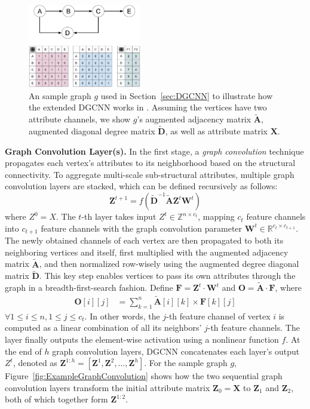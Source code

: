 \begin{figure}[htbp]
\centerline{\includegraphics[width=0.44\textwidth]{Magic/figures/ExampleGraph.eps}}
\caption{An sample graph $g$ used in Section~\ref{sec:DGCNN} to illustrate how the extended DGCNN works in \sysname.
Assuming the vertices have two attribute channels, we show
$g$'s augmented adjacency matrix $\tilde{\mathbf{A}}$, augmented diagonal degree matrix $\tilde{\mathbf{D}}$,
as well as attribute matrix $\mathbf{X}$.}
\label{fig:ExampleGraph}
\end{figure}

\textbf{Graph Convolution Layer(s).} In the first stage, a \textit{graph convolution} technique propagates each vertex's attributes to its neighborhood based on the structural connectivity.
To aggregate multi-scale sub-structural attributes, multiple graph
convolution layers are stacked, which can be defined recursively as follows:
\begin{equation}
    \mathbf{Z}^{t + 1} = f(\tilde{\mathbf{D}}^{-1} \tilde{\mathbf{A}} \mathbf{Z}^t \mathbf{W}^t)
\end{equation}
where $Z^0 = X$. The $t$-th layer takes input $Z^t \in \mathbb{Z}^{n \times c_t}$,
mapping $c_t$ feature channels into $c_{t+1}$ feature channels with the graph convolution parameter $\mathbf{W}^t \in \mathbb{R}^{c_t \times c_{t+1}}$.
The newly obtained channels of each vertex are then propagated to both its neighboring vertices and itself,
 first multiplied with the augmented adjacency matrix $\tilde{\mathbf{A}}$,
and then normalized row-wisely using the augmented degree diagonal matrix $\tilde{\mathbf{D}}$.
This key step enables vertices to pass its own attributes through the graph in a breadth-first-search fashion. %
Define $\mathbf{F} = \mathbf{Z}^t \cdot \mathbf{W}^t$ and $\mathbf{O} = \tilde{\mathbf{A}} \cdot \mathbf{F}$, where
\begin{align}
    \mathbf{O}[i][j] &= \sum_{k = 1}^{n} \tilde{\mathbf{A}}[i][k] \times \mathbf{F}[k][j]
\end{align}
$\forall 1\leq i \leq n, 1 \leq j \leq c_t$.
In other words, the $j$-th feature channel of vertex $i$ is computed as a linear combination of all its neighbors' $j$-th feature channels.
The layer finally outputs the element-wise activation using a nonlinear function $f$.
At the end of $h$ graph convolution layers, DGCNN concatenates each layer's output $Z^{t}$,
denoted as $\mathbf{Z}^{1:h} = [\mathbf{Z}^1, \mathbf{Z}^2, \ldots, \mathbf{Z}^{h}]$.
For the sample graph $g$, Figure~\ref{fig:ExampleGraphConvolution} shows how the two sequential graph convolution layers transform the initial attribute matrix $\mathbf{Z}_0=\mathbf{X}$ to $\mathbf{Z}_1$ and $\mathbf{Z}_2$, both of which together form $\mathbf{Z}^{1:2}$.

